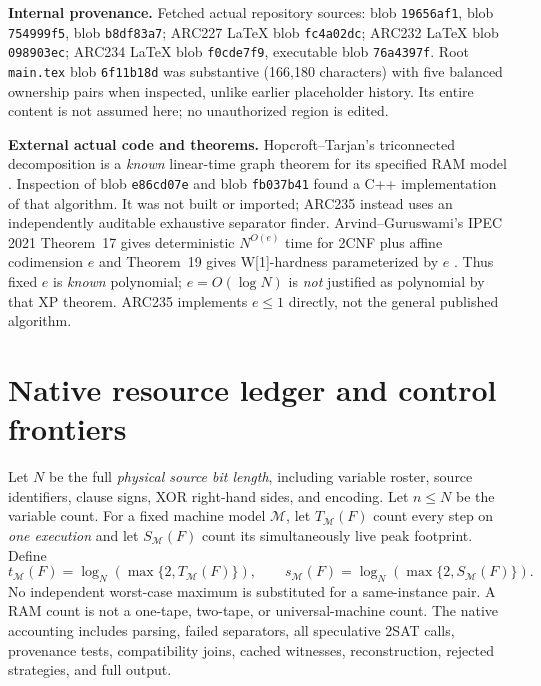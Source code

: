 \documentclass[10pt]{article}
\begin{document}
\noindent\textbf{Internal provenance.} Fetched actual repository sources:  blob \texttt{19656af1},  blob \texttt{754999f5},  blob \texttt{b8df83a7}; ARC227 LaTeX blob \texttt{fc4a02dc}; ARC232 LaTeX blob \texttt{098903ec}; ARC234 LaTeX blob \texttt{f0cde7f9}, executable blob \texttt{76a4397f}. Root \texttt{main.tex} blob \texttt{6f11b18d} was substantive (166,180 characters) with five balanced ownership pairs when inspected, unlike earlier placeholder history. Its entire content is not assumed here; no unauthorized region is edited.

\noindent\textbf{External actual code and theorems.} Hopcroft--Tarjan's triconnected decomposition is a \emph{known} linear-time graph theorem for its specified RAM model \cite{HT1973}. Inspection of  blob \texttt{e86cd07e} and  blob \texttt{fb037b41} found a C++ implementation of that algorithm. It was not built or imported; ARC235 instead uses an independently auditable exhaustive separator finder. Arvind--Guruswami's IPEC 2021 Theorem~17 gives deterministic $N^{O(e)}$ time for 2CNF plus affine codimension $e$ and Theorem~19 gives W[1]-hardness parameterized by $e$ \cite{AG2021}. Thus fixed $e$ is \emph{known} polynomial; $e=O(\log N)$ is \emph{not} justified as polynomial by that XP theorem. ARC235 implements $e\le1$ directly, not the general published algorithm.

\section{Native resource ledger and control frontiers}
Let $N$ be the full \emph{physical source bit length}, including variable roster, source identifiers, clause signs, XOR right-hand sides, and encoding. Let $n\le N$ be the variable count. For a fixed machine model $\mathcal M$, let $T_{\mathcal M}(F)$ count every step on \emph{one execution} and let $S_{\mathcal M}(F)$ count its simultaneously live peak footprint. Define
\[
 t_{\mathcal M}(F)=\log_N(\max\{2,T_{\mathcal M}(F)\}),\qquad
 s_{\mathcal M}(F)=\log_N(\max\{2,S_{\mathcal M}(F)\}).
\]
No independent worst-case maximum is substituted for a same-instance pair. A RAM count is not a one-tape, two-tape, or universal-machine count. The native accounting includes parsing, failed separators, all speculative 2SAT calls, provenance tests, compatibility joins, cached witnesses, reconstruction, rejected strategies, and full output.
\end{document}
